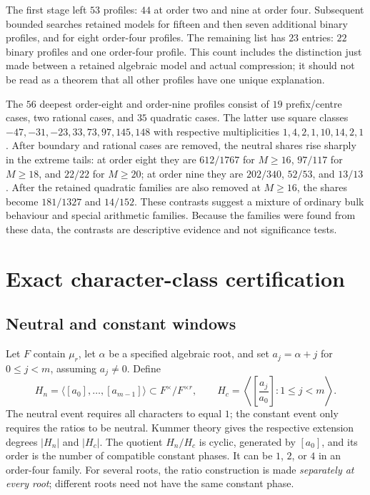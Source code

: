\documentclass[11pt]{article}
\theoremstyle{definition}\newtheorem{definition}[theorem]{Definition}
\begin{document}
The first stage left $53$ profiles: $44$ at order two and nine at
order four. Subsequent bounded searches retained models for fifteen
and then seven additional binary profiles, and for eight order-four
profiles. The remaining list has $23$ entries: $22$ binary profiles
and one order-four profile. This count includes the distinction just
made between a retained algebraic model and actual compression;
it should not be read as a theorem that all other profiles have one
unique explanation.

The $56$ deepest order-eight and order-nine profiles consist of $19$
prefix/centre cases, two rational cases, and $35$ quadratic cases.
The latter use square classes
$-47,-31,-23,33,73,97,145,148$ with respective multiplicities
$1,4,2,1,10,14,2,1$. After boundary and rational cases are removed,
the neutral shares rise sharply in the extreme tails: at order eight
they are $612/1767$ for $M\ge16$, $97/117$ for $M\ge18$, and $22/22$
for $M\ge20$; at order nine they are $202/340$, $52/53$, and $13/13$.
After the retained quadratic families are also removed at $M\ge16$,
the shares become $181/1327$ and $14/152$. These contrasts suggest a
mixture of ordinary bulk behaviour and special arithmetic families.
Because the families were found from these data, the contrasts are
descriptive evidence and not significance tests.

\section{Exact character-class certification}\label{sec:certification}
\subsection{Neutral and constant windows}
Let $F$ contain $\mu_r$, let $\alpha$ be a specified algebraic root,
and set $a_j=\alpha+j$ for $0\le j<m$, assuming $a_j\ne0$. Define
\[
 H_n=\langle[a_0],\ldots,[a_{m-1}]\rangle
       \subset F^\times/F^{\times r},\qquad
 H_c=\left\langle\left[\frac{a_j}{a_0}\right]:1\le j<m\right\rangle.
\]
The neutral event requires all characters to equal $1$; the constant
event only requires the ratios to be neutral. Kummer theory gives
the respective extension degrees $|H_n|$ and $|H_c|$. The quotient
$H_n/H_c$ is cyclic, generated by $[a_0]$, and its order is the number
of compatible constant phases. It can be $1$, $2$, or $4$ in an
order-four family. For several roots, the ratio construction is made
\emph{separately at every root}; different roots need not have the
same constant phase.
\end{document}
